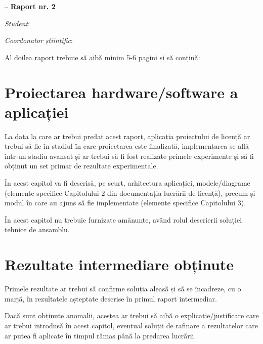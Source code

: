 \documentclass[12pt]{report}
\begin{document}
\sloppy



\begin{center}
    \large
    {\textbf{\thesistype} -- \textbf{Raport nr. 2}}
    
    \vspace{0.5cm}
    
    \normalsize
    \textbf{\thesistitle}
\end{center}

\textit{Student}: \textbf{\authornamelf}

\textit{Coordonator științific}: \textbf{\coordinator}

\vspace{0.5cm}
\iffalse
Al doilea raport trebuie să aibă minim 5-6 pagini și să conțină:

\section*{Proiectarea hardware/software a aplicației}

La data la care ar trebui predat acest raport, aplicația proiectului de licență ar trebui să fie în stadiul în care proiectarea este finalizată, implementarea se află într-un stadiu avansat și ar trebui să fi fost realizate primele experimente și să fi obținut un set primar de rezultate experimentale.

În acest capitol va fi descrisă, pe scurt, arhitectura aplicației, modele/diagrame (elemente specifice Capitolului 2 din documentația lucrării de licență), precum și modul în care au ajuns să fie implementate (elemente specifice Capitolului 3).

În acest capitol nu trebuie furnizate amănunte, având rolul descrierii soluției tehnice de ansamblu.

\section*{Rezultate intermediare obținute}

Primele rezultate ar trebui să confirme soluția aleasă și să se încadreze, cu o marjă, în rezultatele așteptate descrise în primul raport intermediar.

Dacă sunt obținute anomalii, acestea ar trebui să aibă o explicație/justificare care ar trebui introdusă în acest capitol, eventual soluții de rafinare a rezultatelor care ar putea fi aplicate în timpul rămas până la predarea lucrării.
\end{document}

